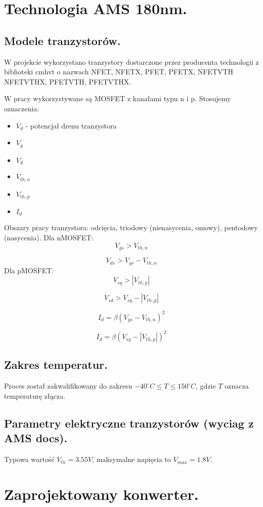 \documentclass[10pt,a4paper]{report}
\begin{document}
	\chapter{Technologia AMS 180nm.}
	
	\section{Modele tranzystorów.}
	{	W projekcie wykorzystano tranzystory dostarczone przez producenta technologii z biblioteki cmhvt o nazwach NFET, NFETX, PFET, PFETX, NFETVTH NFETVTHX, PFETVTH, PFETVTHX.}
	
	W pracy wykorzystywane są MOSFET z kanałami typu n i p. Stosujemy oznaczenia:
	\begin{itemize}
		\item $V_d$ - potencjał drenu tranzystora
		\item $V_g$
		\item $V_d$
		\item $V_{th,n}$
		\item $V_{th,p}$
		\item $I_d$
	\end{itemize}
	Obszary pracy tranzystora: odcięcia, triodowy (nienasycenia, omowy), pentodowy (nasycenia).
	Dla nMOSFET:
	$$
	V_{gs} > V_{th,n}
	$$
	
	$$
	V_{ds} > V_{gs} - V_{th,n}
	$$	
	Dla pMOSFET:
	$$
	V_{sg} > \left|V_{th,p}\right|
	$$
	
	$$
	V_{sd} > V_{sg} - \left|V_{th,p}\right|
	$$	
	
	$$
	I_{d} = \beta \left(V_{gs} - V_{th,n}\right)^2
	$$
	
	$$
	I_{d} = \beta \left(V_{sg} - \left|V_{th,p}\right|\right)^2
	$$
	
	\section{Zakres temperatur.}
	{	Proces został zakwalifikowany do zakresu $-40^\circ C \leq T \leq 150^\circ C$, gdzie $T$ oznacza temperaturę złącza. }

	\section{Parametry elektryczne tranzystorów (wyciag z AMS docs).}
	{	Typowa wartość $V_{th}=3.55V$, maksymalne napięcia to $V_{max}=1.8V$. }
	
	\chapter{Zaprojektowany konwerter.}
\end{document}

